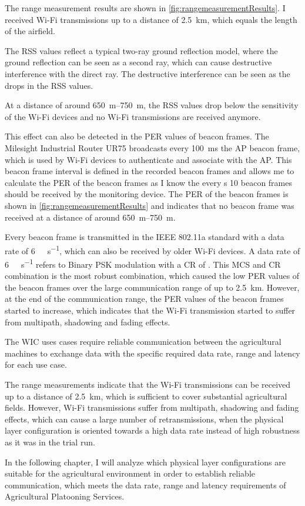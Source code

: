 The range measurement results are shown in \autoref{fig:rangemeasurementResults}.
I received Wi-Fi transmissions up to a distance of \SI{2.5}{\kilo\metre},
which equals the length of the airfield.

The \ac{RSS} values reflect a typical two-ray ground reflection model, where the ground reflection can be seen as a second ray,
which can cause destructive interference with the direct ray.
The destructive interference can be seen as the drops in the \ac{RSS} values.

At a distance of around \SIrange{650}{750}{\metre}, the \ac{RSS} values drop below the sensitivity of the Wi-Fi devices and
no Wi-Fi transmissions are received anymore.

This effect can also be detected in the \ac{PER} values of beacon frames.
The Milesight Industrial Router UR75 broadcasts every \SI{100}{\milli\second} the \ac{AP} beacon frame, which is used by Wi-Fi devices to
authenticate and associate with the \ac{AP}.
This beacon frame interval is defined in the recorded beacon frames and allows me to
calculate the \ac{PER} of the beacon frames as I know the every \si{\second} \num{10} beacon frames should be received by the monitoring device.
The \ac{PER} of the beacon frames is shown in \autoref{fig:rangemeasurementResults} and indicates that no beacon frame was received at
a distance of around \SIrange{650}{750}{\metre}.

Every beacon frame is transmitted in the IEEE 802.11a standard with a data rate of \SI{6}{\mega\bit\per\second}, which can also be received
by older Wi-Fi devices.
A data rate of \SI{6}{\mega\bit\per\second} refers to Binary \ac{PSK} modulation with a \ac{CR} of  \cite{IEEE802.11a}.
This \ac{MCS} and \ac{CR} combination is the most robust combination, which caused the low \ac{PER} values of the beacon frames over
the large communication range of up to \SI{2.5}{\kilo\metre}.
However, at the end of the communication range, the \ac{PER} values of the beacon frames
started to increase, which indicates that the Wi-Fi transmission started to suffer from multipath, shadowing and fading effects.



The \ac{WIC} uses cases require reliable communication between the agricultural machines to exchange data with the specific required data rate, range and latency for each use case.

The range measurements indicate that the Wi-Fi transmissions can be received up to a distance of \SI{2.5}{\kilo\metre},
which is sufficient to cover substantial agricultural fields.
However, Wi-Fi transmissions suffer from multipath, shadowing and fading effects, which can cause a large number of retransmissions,
when the physical layer configuration is oriented towards a high data rate instead of high robustness as it was
in the trial run.

In the following chapter, I will analyze which physical layer
configurations are suitable for the agricultural environment in order to establish reliable communication,
which meets the data rate, range and latency requirements of Agricultural Platooning Services.


